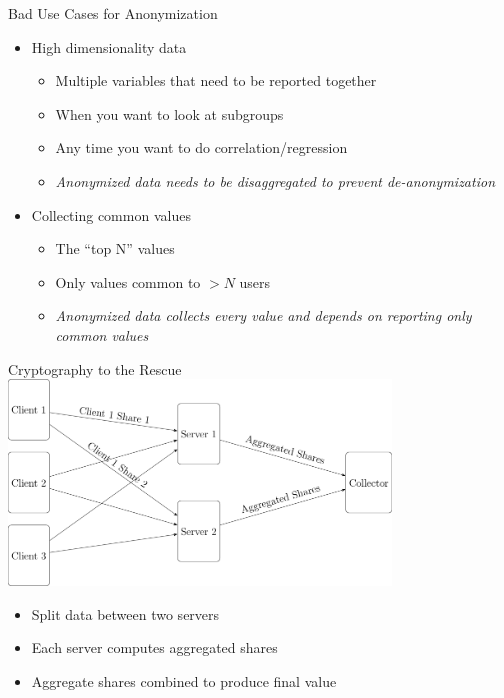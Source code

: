\documentclass[helvetica]{beamer}
\begin{document}
\begin{frame}{Bad Use Cases for Anonymization}

  \begin{itemize}
  \item High dimensionality data
    \begin{itemize}
    \item Multiple variables that need to be reported together
    \item When you want to look at subgroups
    \item Any time you want to do correlation/regression
    \item \emph{Anonymized data needs to be disaggregated to prevent de-anonymization}
    \end{itemize}

  \item Collecting common values
    \begin{itemize}
    \item The ``top N'' values
    \item Only values common to $>N$ users
    \item \emph{Anonymized data collects every value and depends on reporting only common values}      
    \end{itemize}
  \end{itemize}
\end{frame}


\begin{frame}{Cryptography to the Rescue}
{\center
\includegraphics[width=4in]{prio.png}  
}
\begin{itemize}
\item Split data between two servers
\item Each server computes aggregated shares
\item Aggregate shares combined to produce final value  
\end{itemize}
\end{frame}
\end{document}

